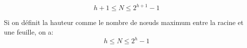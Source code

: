 \documentclass[svgnames,11pt]{beamer}
\begin{document}
\begin{frame}
    \frametitle{}

    \begin{aretenir}[]
    $$h+1 \leqslant N \leqslant 2^{h+1}-1$$
    \end{aretenir}
    \begin{aretenir}[Remarque]
    

Si on définit la hauteur comme le nombre de nœuds maximum entre la racine et une feuille, on a: $$h \leqslant N \leqslant 2^{h}-1$$

    \end{aretenir}
\end{frame}
\end{document}
